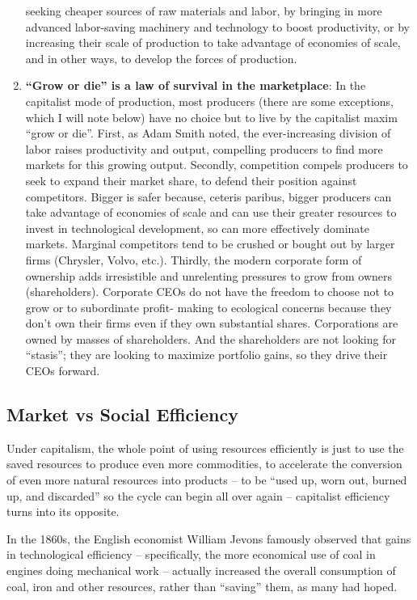\documentclass[
]{book}
\begin{document}
\begin{enumerate}
  seeking cheaper sources of raw materials and labor, by bringing in more advanced
  labor-saving machinery and technology to boost productivity, or by increasing their
  scale of production to take advantage of economies of scale, and in other ways, to
  develop the forces of production.
\item
  \textbf{``Grow or die'' is a law of survival in the marketplace}: In the capitalist mode
  of production, most producers (there are some exceptions, which I will note below)
  have no choice but to live by the capitalist maxim ``grow or die''. First, as Adam
  Smith noted, the ever-increasing division of labor raises productivity and output,
  compelling producers to find more markets for this growing output. Secondly,
  competition compels producers to seek to expand their market share, to defend their
  position against competitors. Bigger is safer because, ceteris paribus, bigger
  producers can take advantage of economies of scale and can use their greater
  resources to invest in technological development, so can more effectively dominate
  markets. Marginal competitors tend to be crushed or bought out by larger firms
  (Chrysler, Volvo, etc.). Thirdly, the modern corporate form of ownership adds
  irresistible and unrelenting pressures to grow from owners (shareholders). Corporate
  CEOs do not have the freedom to choose not to grow or to subordinate profit-
  making to ecological concerns because they don't own their firms even if they own
  substantial shares. Corporations are owned by masses of shareholders. And the
  shareholders are not looking for ``stasis''; they are looking to maximize portfolio
  gains, so they drive their CEOs forward.
\end{enumerate}

\hypertarget{market-vs-social-efficiency}{%
\subsection{Market vs Social Efficiency}\label{market-vs-social-efficiency}}

Under capitalism, the whole point of
using resources efficiently is just to use the saved resources to produce even more
commodities, to accelerate the conversion of even more natural resources into
products -- to be ``used up, worn out, burned up, and discarded'' so the cycle can
begin all over again -- capitalist efficiency turns into its opposite.

In the 1860s, the
English economist William Jevons famously observed that gains in technological
efficiency -- specifically, the more economical use of coal in engines doing
mechanical work -- actually increased the overall consumption of coal, iron and
other resources, rather than ``saving'' them, as many had hoped.
\end{document}
